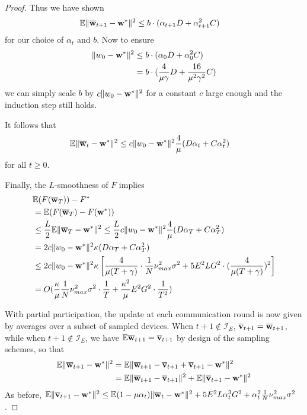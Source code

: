 \begin{proof}
	Thus we have shown 
	\begin{align*}
	\mathbb{E}\|{\overline{\mathbf{w}}}_{t+1}-{\mathbf{w}}^{\ast}\|^{2} & \leq b\cdot(\alpha_{t+1}D+\alpha_{t+1}^{2}C)
	\end{align*}
	for our choice of $\alpha_{t}$ and $b$. Now to ensure 
	\begin{align*}
	\|w_{0}-{\mathbf{w}}^{\ast}\|^{2} & \leq b\cdot(\alpha_{0}D+\alpha_{0}^{2}C)\\
	& =b\cdot(\frac{4}{\mu\gamma}D+\frac{16}{\mu^{2}\gamma^{2}}C)
	\end{align*}
	we can simply scale $b$ by $c\|w_{0}-{\mathbf{w}}^{\ast}\|^{2}$ for a constant
	$c$ large enough and the induction step still holds. 
	
	It follows that 
	\begin{align*}
	\mathbb{E}\|{\overline{\mathbf{w}}}_{t}-{\mathbf{w}}^{\ast}\|^{2} & \leq c\|w_{0}-{\mathbf{w}}^{\ast}\|^{2}\frac{4}{\mu}(D\alpha_{t}+C\alpha_{t}^{2})
	\end{align*}
	for all $t\geq0$. 
	
	Finally, the $L$-smoothness of $F$ implies 
	\begin{align*}
	& \mathbb{E}(F({\overline{\mathbf{w}}}_{T}))-F^{\ast}\\
	& =\mathbb{E}(F({\overline{\mathbf{w}}}_{T})-F({\mathbf{w}}^{\ast}))\\
	& \leq\frac{L}{2}\mathbb{E}\|{\overline{\mathbf{w}}}_{T}-{\mathbf{w}}^{\ast}\|^{2}\leq\frac{L}{2}c\|w_{0}-{\mathbf{w}}^{\ast}\|^{2}\frac{4}{\mu}(D\alpha_{T}+C\alpha_{T}^{2})\\
	& =2c\|w_{0}-{\mathbf{w}}^{\ast}\|^{2}\kappa(D\alpha_{T}+C\alpha_{T}^{2})\\
	& \leq2c\|w_{0}-{\mathbf{w}}^{\ast}\|^{2}\kappa\left[\frac{4}{\mu(T+\gamma)}\cdot\frac{1}{N}\nu_{max}^{2}\sigma^{2}+5E^{2}LG^{2}\cdot(\frac{4}{\mu(T+\gamma)})^{2}\right]\\
	& =O(\frac{\kappa}{\mu}\frac{1}{N}\nu_{max}^{2}\sigma^{2}\cdot\frac{1}{T}+\frac{\kappa^{2}}{\mu}E^{2}G^{2}\cdot\frac{1}{T^{2}})
	\end{align*}
	
	With partial participation, the update at each communication round
	is now given by averages over a subset of sampled devices. When $t+1\notin\mathcal{I}_{E}$,
	${\overline{\mathbf{v}}}_{t+1}={\overline{\mathbf{w}}}_{t+1}$, while when $t+1\notin\mathcal{I}_{E}$,
	we have $\mathbb{E}{\overline{\mathbf{w}}}_{t+1}={\overline{\mathbf{v}}}_{t+1}$ by design
	of the sampling schemes, so that 
	\begin{align*}
	\mathbb{E}\|{\overline{\mathbf{w}}}_{t+1}-{\mathbf{w}}^{\ast}\|^{2} & =\mathbb{E}\|{\overline{\mathbf{w}}}_{t+1}-{\overline{\mathbf{v}}}_{t+1}+{\overline{\mathbf{v}}}_{t+1}-{\mathbf{w}}^{\ast}\|^{2}\\
	& =\mathbb{E}\|{\overline{\mathbf{w}}}_{t+1}-{\overline{\mathbf{v}}}_{t+1}\|^{2}+\mathbb{E}\|{\overline{\mathbf{v}}}_{t+1}-{\mathbf{w}}^{\ast}\|^{2}
	\end{align*}
	As before, $\mathbb{E}\|{\overline{\mathbf{v}}}_{t+1}-{\mathbf{w}}^{\ast}\|^{2}\leq\mathbb{E}(1-\mu\alpha_{t})\|{\overline{\mathbf{w}}}_{t}-{\mathbf{w}}^{\ast}\|^{2}+5E^{2}L\alpha_{t}^{3}G^{2}+\alpha_{t}^{2}\frac{1}{N}\nu_{max}^{2}\sigma^{2}$. 
	

\end{proof}
